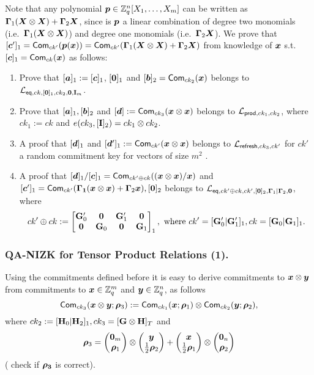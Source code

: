 Note that any polynomial ${\boldsymbol{p}}\in\mathbb{Z}_q^n[X_1,\ldots,X_m]$ can be written as $\mathbf{{\Gamma}}_1({\boldsymbol{X}}\otimes{\boldsymbol{X}})+\mathbf{{\Gamma}}_2{\boldsymbol{X}}$, since is ${\boldsymbol{p}}$ a linear combination of degree two monomials (i.e.~$\mathbf{{\Gamma}}_1({\boldsymbol{X}}\otimes{\boldsymbol{X}})$) and degree one monomials (i.e.~$\mathbf{{\Gamma}}_2{\boldsymbol{X}}$).
We prove that $[{\boldsymbol{c}}']_1=\mathsf{Com}_{ck'}({\boldsymbol{p}}({\boldsymbol{x}}))=\mathsf{Com}_{ck'}(\mathbf{{\Gamma}}_1({\boldsymbol{X}}\otimes{\boldsymbol{X}})+\mathbf{{\Gamma}}_2{\boldsymbol{X}})$ from knowledge of ${\boldsymbol{x}}$ s.t. $[{\boldsymbol{c}}]_1 = \mathsf{Com}_{ck}({\boldsymbol{x}})$ as follows:
\begin{enumerate}
\item Prove that $[{\boldsymbol{a}}]_1:=[{\boldsymbol{c}}]_1$,  $[{\boldsymbol{0}}]_1$ and $[{\boldsymbol{b}}]_2=\mathsf{Com}_{ck_2}({\boldsymbol{x}})$ belongs to $\mathcal{L}_{\mathsf{eq},ck,[\mathbf{{0}}]_1,ck_2,\mathbf{{0}},\mathbf{{I}}_{m}}$.
\item Prove that $[{\boldsymbol{a}}]_1,[{\boldsymbol{b}}]_2$ and $[{\boldsymbol{d}}]:=\mathsf{Com}_{ck_3}({\boldsymbol{x}}\otimes{\boldsymbol{x}})$ belongs to $\mathcal{L}_{\mathsf{prod},ck_1,ck_2}$, where $ck_1:=ck$ and $e(ck_3,[\mathbf{{I}}]_2)=ck_1\otimes ck_2$.
\item A proof that $[{\boldsymbol{d}}]_1$ and $[{\boldsymbol{d}}']_1:=\mathsf{Com}_{ck'}({\boldsymbol{x}}\otimes{\boldsymbol{x}})$ belongs to $\mathcal{L}_{\mathsf{refresh},ck_3,ck'}$ for $ck'$ a random commitment key for vectors of size $m^2$ .
\item A proof that $[{\boldsymbol{d}}]_1/[{\boldsymbol{c}}]_1=\mathsf{Com}_{ck'\oplus ck}(({\boldsymbol{x}}\otimes{\boldsymbol{x}})/{\boldsymbol{x}})$ and $[{\boldsymbol{c}}']_1=\mathsf{Com}_{ck'}(\mathbf{{\Gamma_1}}({\boldsymbol{x}}\otimes{\boldsymbol{x}})+\mathbf{{\Gamma}}_2{\boldsymbol{x}}),[{\boldsymbol{0}}]_2$ belongs to $\mathcal{L}_{\mathsf{eq},ck'\oplus ck,ck',[\mathbf{{0}}]_2,\mathbf{{\Gamma}}_1|\mathbf{{\Gamma}}_2,\mathbf{{0}}}$, where
$$
ck'\oplus ck := \left[\begin{matrix}
\mathbf{{G}}'_0 & \mathbf{{0}}      & \mathbf{{G}}'_1 &  \mathbf{{0}} \\
\mathbf{{0}}      & \mathbf{{G}}_0  & \mathbf{{0}}      & \mathbf{{G}}_1
\end{matrix}\right]_1,
\text{ where } ck'=[\mathbf{{G}}'_0|\mathbf{{G}}'_1]_1, ck=[\mathbf{{G}}_0|\mathbf{{G}}_1]_1.
$$
\end{enumerate}

\subsubsection{QA-NIZK for Tensor Product Relations (1).}
Using the commitments defined before it is easy to derive commitments to ${\boldsymbol{x}}\otimes{\boldsymbol{y}}$ from commitments to ${\boldsymbol{x}}\in\mathbb{Z}_q^m$ and ${\boldsymbol{y}}\in\mathbb{Z}_q^n$, as follows
$$
\mathsf{Com}_{ck_3}({\boldsymbol{{\boldsymbol{x}}}}\otimes{\boldsymbol{y}};{\boldsymbol{\rho}}_3):=\mathsf{Com}_{ck_1}({\boldsymbol{x}};{\boldsymbol{\rho}}_1)\otimes\mathsf{Com}_{ck_2}({\boldsymbol{y}};{\boldsymbol{\rho}}_2),
$$
where $ck_2:=[\mathbf{{H}}_0|\mathbf{{H}}_2]_1,ck_3=[\mathbf{{G}}\otimes\mathbf{{H}}]_T$ and
$${\boldsymbol{\rho}}_3=\left(\begin{matrix}{\boldsymbol{0}}_m\\{\boldsymbol{\rho}}_1\end{matrix}\right)\otimes\left(\begin{matrix}{\boldsymbol{y}}\\\frac{1}{2}{\boldsymbol{\rho}}_2\end{matrix}\right)+\left(\begin{matrix}{\boldsymbol{x}}\\\frac{1}{2}{\boldsymbol{\rho}}_1\end{matrix}\right)\otimes\left(\begin{matrix}{\boldsymbol{0}}_n\\{\boldsymbol{\rho}}_2\end{matrix}\right)$$ ({\color{red} check if ${\boldsymbol{\rho_3}}$ is correct}).

